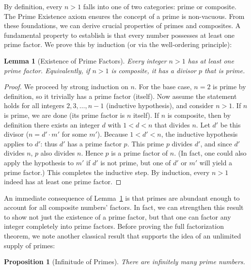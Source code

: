 \documentclass[11pt]{article}
\newtheorem{lemma}[theorem]{Lemma}
\newtheorem{proposition}[theorem]{Proposition}
\begin{document}
By definition, every $n > 1$ falls into one of two categories: prime or composite. The Prime Existence axiom ensures the concept of a prime is non-vacuous. From these foundations, we can derive crucial properties of primes and composites. A fundamental property to establish is that every number possesses at least one prime factor. We prove this by induction (or via the well-ordering principle):

\begin{lemma}[Existence of Prime Factors]\label{lem:prime-factor}
Every integer $n > 1$ has at least one prime factor. Equivalently, if $n>1$ is composite, it has a divisor $p$ that is prime.
\end{lemma}

\begin{proof}
We proceed by strong induction on $n$. For the base case, $n=2$ is prime by definition, so it trivially has a prime factor (itself). Now assume the statement holds for all integers $2,3,\ldots, n-1$ (inductive hypothesis), and consider $n>1$. If $n$ is prime, we are done (its prime factor is $n$ itself). If $n$ is composite, then by definition there exists an integer $d$ with $1 < d < n$ that divides $n$. Let $d'$ be this divisor ($n = d' \cdot m'$ for some $m'$). Because $1 < d' < n$, the inductive hypothesis applies to $d'$: thus $d'$ has a prime factor $p$. This prime $p$ divides $d'$, and since $d'$ divides $n$, $p$ also divides $n$. Hence $p$ is a prime factor of $n$. (In fact, one could also apply the hypothesis to $m'$ if $d'$ is not prime, but one of $d'$ or $m'$ will yield a prime factor.) This completes the inductive step. By induction, every $n>1$ indeed has at least one prime factor.
\end{proof}

An immediate consequence of Lemma~\ref{lem:prime-factor} is that primes are abundant enough to account for all composite numbers' factors. In fact, we can strengthen this result to show not just the existence of a prime factor, but that one can factor any integer completely into prime factors. Before proving the full factorization theorem, we note another classical result that supports the idea of an unlimited supply of primes:

\begin{proposition}[Infinitude of Primes]\label{prop:infinitude}
There are infinitely many prime numbers.
\end{proposition}
\end{document}
